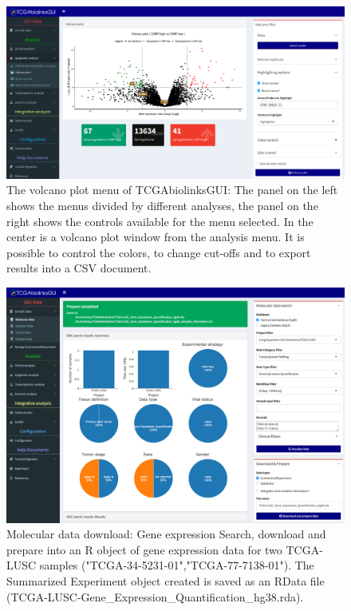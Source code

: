   \begin{figure}[h!]
    \includegraphics[width=1.0\linewidth]{images/fig1-GUI.pdf}

  \caption[TCGAbiolinksGUI: The volcano plot menu]{The volcano plot menu of TCGAbiolinksGUI: The panel on the left shows the menus divided by different analyses, the panel on the right shows the controls available for the menu selected. In the center is a volcano plot window from the  analysis menu. It is possible to control the colors, to change cut-offs and to export results into a CSV document.}
  \label{fig:fig1}
   \end{figure}

  \begin{figure}[h!]
  \includegraphics[width=1.0\linewidth]{images/fig2-Data_expression.png}

  \caption[TCGAbiolinksGUI: Gene expression download: ]{Molecular data download: Gene expression Search, download and prepare into an R object of gene expression data for two TCGA-LUSC samples ("TCGA-34-5231-01","TCGA-77-7138-01"). The Summarized Experiment object created is saved as an RData file (TCGA-LUSC-Gene\_Expression\_Quantification\_hg38.rda). }
  \label{fig:geneexp}
   \end{figure}

